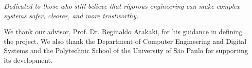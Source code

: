 \documentclass[
	12pt,				%
	openright,			%
	twoside,			%
	a4paper,
	chapter=TITLE,
	english				%
	]{abntex2}
\begin{document}
% 

\begin{dedicatoria}
   \vspace*{\fill}
   \noindent\hfill
   \begin{minipage}{0.55\textwidth}
     \raggedleft
     \textit{Dedicated to those who still believe that rigorous engineering can
     make complex systems safer, clearer, and more trustworthy.}\par
   \end{minipage}\par
\end{dedicatoria}

\begin{agradecimentos}
We thank our advisor, Prof. Dr. Reginaldo Arakaki, for his guidance in defining
the project. We also thank the Department of Computer Engineering and Digital
Systems and the Polytechnic School of the University of São Paulo for
supporting its development.
\end{agradecimentos}

\end{document}
